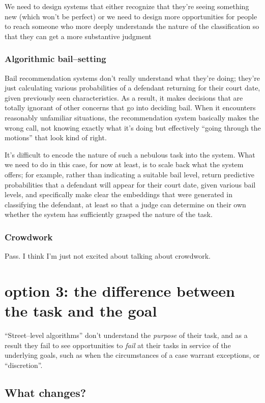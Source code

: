 \documentclass[main]{subfiles}
\begin{document}
We need to design systems that either recognize that they're seeing something new
(which won't be perfect)
or we need to design more opportunities for people
to reach someone who more deeply understands the nature of the classification
so that they can get a more substantive judgment

\subsubsection{Algorithmic bail--setting}
Bail recommendation systems don't really understand what they're doing;
they're just calculating various probabilities of
a defendant returning for their court date, given previously seen characteristics.
As a result,
it makes decisions that are totally ignorant of other concerns that go into deciding bail.
When it encounters reasonably unfamiliar situations, the recommendation system
basically makes the wrong call, not knowing exactly what it's doing
but effectively ``going through the motions'' that look kind of right.

It's difficult to encode the nature of such a nebulous task into the system.
What we need to do in this case, for now at least, is
to scale back what the system offers;
for example, rather than indicating a suitable bail level,
return predictive probabilities that a defendant will appear for their court date,
given various bail levels, and
specifically make clear the embeddings that were generated in classifying the defendant,
at least so that a judge can determine on their own whether
the system has sufficiently grasped the nature of the task.

\subsubsection{Crowdwork}
Pass. I think I'm just not excited about talking about crowdwork.

\section{option 3: the difference between the task and the goal}
``Street--level algorithms'' don't understand the \textit{purpose} of their task, and as a result they fail to see opportunities to \textit{fail} at their tasks in service of the underlying goals, such as when the circumstances of a case warrant exceptions, or ``discretion''.


\subsection{What changes?}
\end{document}
